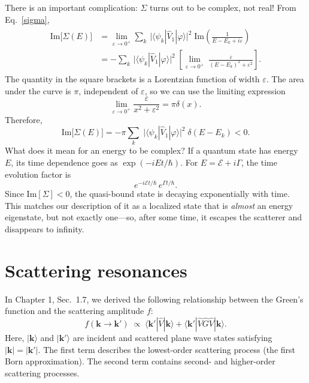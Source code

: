\documentclass[pra,12pt]{revtex4-2}
\begin{document}
There is an important complication: $\Sigma$ turns out to be complex,
not real!  From Eq.~\eqref{sigma},
\begin{align}
  \begin{aligned}\mathrm{Im}\big[\Sigma(E)\big] &= \lim_{\varepsilon\rightarrow0^+} \sum_k\, \Big| \langle\psi_k| \hat{V}_1|\varphi\rangle\Big|^2 \; \mathrm{Im}\left( \frac{1}{\displaystyle E-E_k+i\varepsilon}\right) \\ &= - \sum_k\, \Big| \langle\psi_k| \hat{V}_1|\varphi\rangle\Big|^2 \; \left[ \lim_{\varepsilon\rightarrow0^+} \; \frac{\varepsilon}{\displaystyle (E-E_k)^2 + \varepsilon^2}\right].\end{aligned}
\end{align}
The quantity in the square brackets is a Lorentzian function of
width $\varepsilon$.  The area under the curve is $\pi$, independent
of $\varepsilon$, so we can use the limiting expression
\begin{equation}
  \lim_{\varepsilon\rightarrow 0^+} \frac{\varepsilon}{x^2+\varepsilon^2} = \pi\delta(x).
\end{equation}
Therefore,
\begin{equation}
  \mathrm{Im}\big[\Sigma(E)\big]
  = - \pi \sum_k \; \big| \langle\psi_k| \hat{V}_1|\varphi\rangle\big|^2
  \; \delta(E-E_k) < 0.
  \label{fermigr1}
\end{equation}
What does it mean for an energy to be complex?  If a quantum state has
energy $E$, its time dependence goes as $\exp(-iE t/\hbar)$.  For $E =
\mathcal{E} + i \Gamma$, the time evolution factor is
\begin{equation*}
  e^{-i\mathcal{E} t/\hbar} \, e^{\Gamma t/\hbar}.
\end{equation*}
Since $\mathrm{Im}[\Sigma] < 0$, the quasi-bound state is decaying
exponentially with time.  This matches our description of it as a
localized state that is \textit{almost} an energy eigenstate, but not
exactly one---so, after some time, it escapes the scatterer and
disappears to infinity.

\section{Scattering resonances}
\label{sec:scattering_resonances}

In Chapter 1, Sec.~1.7, we derived the following relationship between
the Green's function and the scattering amplitude $f$:
\begin{equation}
  f(\mathbf{k}\rightarrow\mathbf{k}') \;\propto\; \langle \mathbf{k}'|\hat{V}|\mathbf{k}\rangle + \langle \mathbf{k}'|\hat{V}\hat{G}\hat{V}|\mathbf{k}\rangle.
\end{equation}
Here, $|\mathbf{k}\rangle$ and $|\mathbf{k}'\rangle$ are incident and
scattered plane wave states satisfying $|\mathbf{k}|=|\mathbf{k}'|$.
The first term describes the lowest-order scattering process (the
first Born approximation).  The second term contains second- and
higher-order scattering processes.
\end{document}
